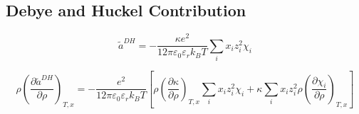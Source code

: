 \documentclass[12pt, letterpaper]{article}
\begin{document}
\subsection{Debye and Huckel Contribution}


\begin{equation}
    \tilde{a}^{DH}=-\frac{\kappa e^{2}}{12\pi\varepsilon_{0}\varepsilon_{r}k_{B}T}\sum_{i}x_{i}z_{i}^{2}\chi_{i}
    \label{eq:ares_dh}
\end{equation}



\begin{equation}
    \rho\left(\frac{\partial\tilde{a}^{DH}}{\partial\rho}\right)_{T,x}
    =
    -\frac{e^2}{12\pi\varepsilon_0\varepsilon_r k_B T}
    \left[
        \rho\left(\frac{\partial \kappa}{\partial \rho}\right)_{T,x}\sum_i x_i z_i^2 \chi_i
        +
        \kappa\sum_i x_i z_i^2 \rho\left(\frac{\partial \chi_i}{\partial \rho}\right)_{T,x}
    \right]
    \label{eq:dh_ares_dadrho}
\end{equation}

\end{document}
